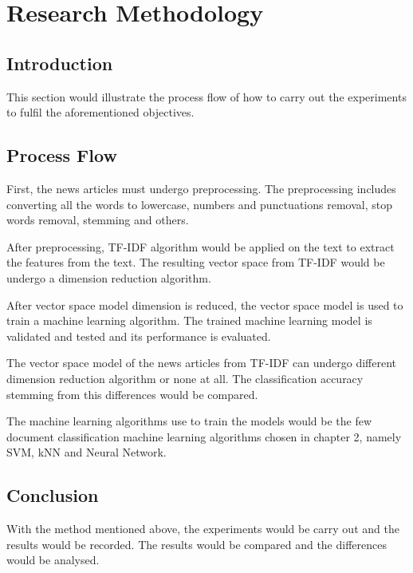 \chapter{Research Methodology}
\section{Introduction}
This section would illustrate the process flow of how to carry out the experiments to fulfil the aforementioned objectives.

\section{Process Flow}

First, the news articles must undergo preprocessing. The preprocessing includes converting all the words to lowercase, numbers and punctuations removal, stop words removal, stemming and others. 

After preprocessing, TF-IDF algorithm would be applied on the text to extract the features from the text. The resulting vector space from TF-IDF would be undergo a dimension reduction algorithm.

After vector space model dimension is reduced, the vector space model is used to train a machine learning algorithm. The trained machine learning model is validated and tested and its performance is evaluated.

The vector space model of the news articles from TF-IDF can undergo different dimension reduction algorithm or none at all. The classification accuracy stemming from this differences would be compared. 

The machine learning algorithms use to train the models would be the few document classification machine learning algorithms chosen in chapter 2, namely SVM, kNN and Neural Network.

\section{Conclusion}
With the method mentioned above, the experiments would be carry out and the results would be recorded. The results would be compared and the differences would be analysed.